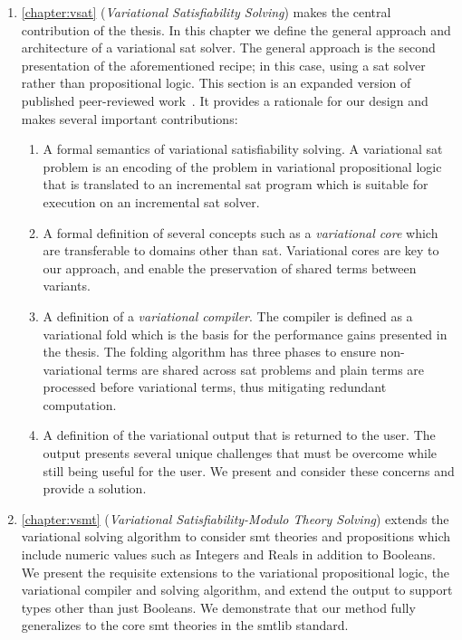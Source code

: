 \begin{enumerate}
  \item \autoref{chapter:vsat} (\emph{Variational Satisfiability Solving}) makes
    the central contribution of the thesis. In this chapter we define the
    general approach and architecture of a variational \ac{sat} solver. The
    general approach is the second presentation of the aforementioned recipe; in
    this case, using a \ac{sat} solver rather than propositional logic. This
    section is an expanded version of published peer-reviewed
    work~\cite{YWT:SPLC20}. It provides a rationale for our design and makes
    several important contributions:
    \begin{enumerate}
    \item A formal semantics of variational satisfiability solving. A
      variational \ac{sat} problem is an encoding of the problem in variational
      propositional logic that is translated to an incremental \ac{sat} program
      which is suitable for execution on an incremental \ac{sat} solver.
    \item A formal definition of several concepts such as a \emph{variational
        core} which are transferable to domains other than \ac{sat}. Variational
      cores are key to our approach, and enable the preservation of shared terms
      between variants.
    \item A definition of a \emph{variational compiler}. The compiler is defined
      as a variational fold which is the basis for the performance gains
      presented in the thesis. The folding algorithm has three phases to ensure
      non-variational terms are shared across \ac{sat} problems and plain terms
      are processed before variational terms, thus mitigating redundant
      computation.
    \item A definition of the variational output that is returned to the user.
      The output presents several unique challenges that must be overcome while
      still being useful for the user. We present and consider these
      concerns and provide a solution.
    \end{enumerate}

  \item \autoref{chapter:vsmt} (\emph{Variational Satisfiability-Modulo Theory
      Solving}) extends the variational solving algorithm to consider \ac{smt}
    theories and propositions which include numeric values such as Integers and
    Reals in addition to Booleans. We present the requisite extensions to the
    variational propositional logic, the variational compiler and solving
    algorithm, and extend the output to support types other than just Booleans.
    We demonstrate that our method fully generalizes to the core \ac{smt}
    theories in the \acl{smtlib} standard.


\end{enumerate}
